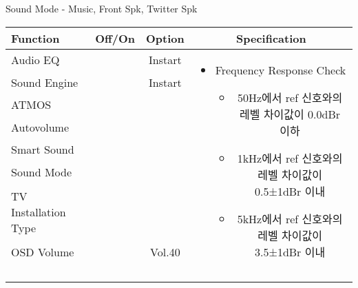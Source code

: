 \begin{frame}[t]{Sound Mode - Music, Front Spk, Twitter Spk}
\begin{tiny}
\begin{tabular}{@{}lccc@{}}
\toprule
Function & Off/On & Option & Specification \\
\midrule
Audio EQ & \color{black}{Off} & Instart &
\multirow{10}{60mm}{
\begin{itemize}
	\item Frequency Response Check
	\begin{itemize}
		\item 50Hz에서 ref 신호와의 레벨 차이값이 0.0dBr 이하		
		\item 1kHz에서 ref 신호와의 레벨 차이값이 0.5±1dBr 이내
		\item 5kHz에서 ref 신호와의 레벨 차이값이 3.5±1dBr 이내		
	\end{itemize}
\end{itemize}
} \\
Sound Engine & \color{blue}{On} & Instart & \\
ATMOS & \color{black}{Off}  & & \\
Autovolume & \color{black}{Off} & & \\
Smart Sound & \color{black}{Off} & & \\
Sound Mode & \color{blue}{On} & \color{blue}{Music} & \\
TV Installation Type & \color{blue}{On} & \color{black}{Standtype1} & \\
OSD Volume & \color{blue}{On} & Vol.40 & \\
& & & \\
& & & \\
& & & \\
& & & \\
\midrule
\end{tabular}
\end{tiny}


\end{frame}
